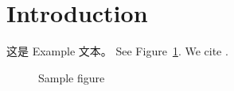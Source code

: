 \section{Introduction}
这是 Example 文本。
See Figure~\ref{fig:sample}.
We cite \cite{ref1}.

\begin{figure}
    \centering
	\caption{Sample figure}
    \label{fig:sample}
\end{figure}
